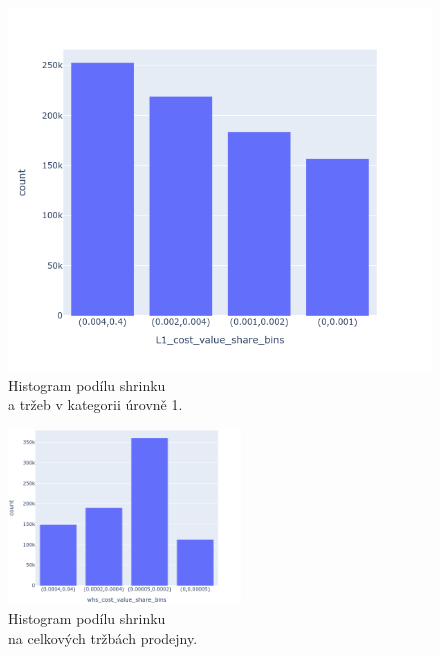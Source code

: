 \begin{figure}[h!]
\begin{minipage}[b]{.55\textwidth}
        \includegraphics[width=\textwidth]{obrazky/grafy/histogram/newplot(3).png}
        \vspace*{-3em}
        \caption{Histogram podílu shrinku \\a tržeb v kategorii úrovně 1.}
        \label{obr:nb:hist4}
    \end{minipage}     
       \vspace*{-1em}
\end{figure}

\begin{figure}[h!]
        \centering
        \captionsetup{justification=centering}
        \includegraphics[width=0.55\textwidth]{obrazky/grafy/histogram/newplot(4).png}
        \caption{Histogram podílu shrinku \\na celkových tržbách prodejny.}
        \label{obr:nb:hist5}
        \vspace*{-1em}
\end{figure}

